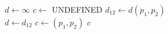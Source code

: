 \documentclass[12pt,a4paper]{article}
\begin{document}
	\begin{algorithm}
		\begin{algorithmic}
				\State $ d \gets \infty $
				\State $ c \gets $ UNDEFINED
						\State $ d_{12} \gets d(p_1, p_2) $
						\\
							\State $ d \gets d_{12} $
							\State $ c \gets (p_1, p_2) $
						\EndIf
					\EndFor
				\EndFor
				\Return $ c $
			\EndProcedure
		\end{algorithmic}
	\end{algorithm}
\end{document}
